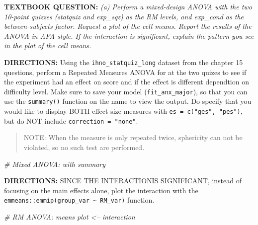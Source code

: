 \documentclass[]{article}
\newenvironment{Shaded}{\begin{snugshade}}{\end{snugshade}}
\newcommand{\CommentTok}[1]{\textcolor[rgb]{0.56,0.35,0.01}{\textit{#1}}}
\begin{document}
\textbf{TEXTBOOK QUESTION:} \emph{(a) Perform a mixed-design ANOVA with
the two 10-point quizzes (statquiz and exp\_sqz) as the RM levels, and
exp\_cond as the between-subjects factor. Request a plot of the cell
means. Report the results of the ANOVA in APA style. If the interaction
is significant, explain the pattern you see in the plot of the cell
means.}

\textbf{DIRECTIONS:} Using the \texttt{ihno\_statquiz\_long} dataset
from the chapter 15 questions, perform a Repeated Measures ANOVA for at
the two quizes to see if the experiment had an effect on score and if
the effect is different dependtion on difficulty level. Make sure to
save your model (\texttt{fit\_anx\_major}), so that you can use the
\texttt{summary()} function on the name to view the output. Do specify
that you would like to display BOTH effect size measures with
\texttt{es\ =\ c("ges",\ "pes")}, but do NOT include
\texttt{correction\ =\ "none"}.

\begin{quote}
NOTE: When the measure is only repeated twice, sphericity can not be
violated, so no such test are performed.
\end{quote}

\begin{Shaded}
\begin{Highlighting}[]
\CommentTok{# Mixed ANOVA:  with summary}
\end{Highlighting}
\end{Shaded}

\clearpage

\textbf{DIRECTIONS:} SINCE THE INTERACTIONIS SIGNIFICANT, instead of
focusing on the main effects alone, plot the interaction with the
\texttt{emmeans::emmip(group\_var\ \textasciitilde{}\ RM\_var)}
function.

\begin{Shaded}
\begin{Highlighting}[]
\CommentTok{# RM ANOVA: means plot <-- interaction}
\end{Highlighting}
\end{Shaded}
\end{document}
